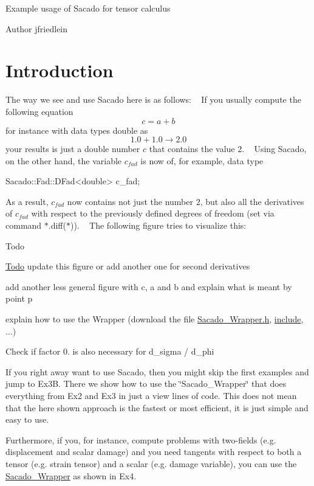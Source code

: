 Example usage of Sacado for tensor calculus\begin{DoxyAuthor}{Author}
jfriedlein
\end{DoxyAuthor}
\hypertarget{index_intro}{}\section{Introduction}\label{index_intro}
The way we see and use Sacado here is as follows\+: ~\newline
If you usually compute the following equation ~\newline
 \[ c = a + b \] for instance with data types double as ~\newline
 \[ 1.0 + 1.0 \rightarrow 2.0 \] your results is just a double number $ c $ that contains the value $ 2 $. ~\newline
 Using Sacado, on the other hand, the variable $ c_{fad} $ is now of, for example, data type 
\begin{DoxyCode}
Sacado::Fad::DFad<double> c\_fad;
\end{DoxyCode}
 As a result, $ c_{fad} $ now contains not just the number $ 2 $, but also all the derivatives of $ c_{fad} $ with respect to the previously defined degrees of freedom (set via command $\ast$.diff($\ast$)). ~\newline
The following figure tries to visualize this\+:  \begin{DoxyRefDesc}{Todo}
\item[\hyperlink{todo__todo000001}{Todo}]update this figure or add another one for second derivatives 

add another less general figure with c, a and b and explain what is meant by point p 

explain how to use the Wrapper (download the file \hyperlink{Sacado__Wrapper_8h}{Sacado\+\_\+\+Wrapper.\+h}, \hyperlink{CMakeCache_8txt_a986ccfc90e04633694fe6cff5472be19}{include}, ...) 

Check if factor 0. is also necessary for d\+\_\+sigma / d\+\_\+phi\end{DoxyRefDesc}


If you right away want to use Sacado, then you might skip the first examples and jump to Ex3B. There we show how to use the \char`\"{}\+Sacado\+\_\+\+Wrapper\char`\"{} that does everything from Ex2 and Ex3 in just a view lines of code. This does not mean that the here shown approach is the fastest or most efficient, it is just simple and easy to use.

Furthermore, if you, for instance, compute problems with two-\/fields (e.\+g. displacement and scalar damage) and you need tangents with respect to both a tensor (e.\+g. strain tensor) and a scalar (e.\+g. damage variable), you can use the \hyperlink{namespaceSacado__Wrapper}{Sacado\+\_\+\+Wrapper} as shown in Ex4.

